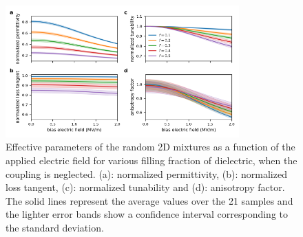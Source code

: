 \documentclass[%
 aip,
 amsmath,amssymb,
 reprint,%
]{revtex4-1}
\begin{document}
\begin{figure}[h!]
 \centering
 \includegraphics[width=0.8\textwidth]{effpar_rand_uncpl.png}
 \caption{Effective parameters of the random 2D mixtures as a function of the
  applied electric field for various filling fraction of dielectric, when the
  coupling is neglected.
  (a): normalized permittivity, (b): normalized loss tangent, (c): normalized tunability and
  (d): anisotropy factor. The solid lines represent the average values
  over the 21 samples and the lighter error bands show a confidence interval corresponding to
  the standard deviation.}
 \label{eff_par_2Drand_TM_uncpl}
\end{figure}
%







\vskip2pc
\end{document}
